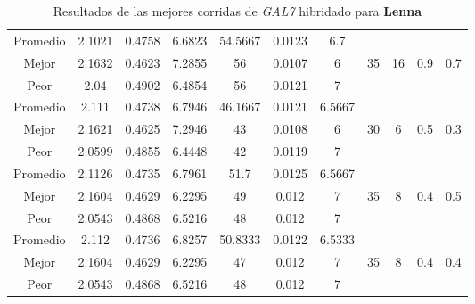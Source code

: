 \begin{table}[h!]
\begin{center}
\begin{tabular}{|c|c|c|c|c|c|c|c|c|c|c|}
        \hline
        \hline
            Promedio  & 2.1021 & 0.4758 & 6.6823 & 54.5667 & 0.0123 & 6.7 &  &  &  & \\
            \cline{1-7}
            Mejor & 2.1632 & 0.4623  & 7.2855 & 56 & 0.0107 & 6 & 35 & 16 & 0.9 & 0.7\\
            \cline{1-7}
            Peor & 2.04 & 0.4902  & 6.4854 & 56 & 0.0121 & 7 &  &  &  & \\
        \hline
        \hline
            Promedio  & 2.111 & 0.4738 & 6.7946 & 46.1667 & 0.0121 & 6.5667 &  &  &  & \\
            \cline{1-7}
            Mejor & 2.1621 & 0.4625  & 7.2946 & 43 & 0.0108 & 6 & 30 & 6 & 0.5 & 0.3\\
            \cline{1-7}
            Peor & 2.0599 & 0.4855  & 6.4448 & 42 & 0.0119 & 7 &  &  &  & \\
        \hline
        \hline
            Promedio  & 2.1126 & 0.4735 & 6.7961 & 51.7 & 0.0125 & 6.5667 &  &  &  & \\
            \cline{1-7}
            Mejor & 2.1604 & 0.4629  & 6.2295 & 49 & 0.012 & 7 & 35 & 8 & 0.4 & 0.5\\
            \cline{1-7}
            Peor & 2.0543 & 0.4868  & 6.5216 & 48 & 0.012 & 7 &  &  &  & \\
        \hline
        \hline
            Promedio  & 2.112 & 0.4736 & 6.8257 & 50.8333 & 0.0122 & 6.5333 &  &  &  & \\
            \cline{1-7}
            Mejor & 2.1604 & 0.4629  & 6.2295 & 47 & 0.012 & 7 & 35 & 8 & 0.4 & 0.4\\
            \cline{1-7}
            Peor & 2.0543 & 0.4868  & 6.5216 & 48 & 0.012 & 7 &  &  &  & \\
        \hline
        \end{tabular}
        \caption{Resultados de las mejores corridas de \emph{GAL7} hibridado para {\bf Lenna}}
        \label{tb:tableGAL7}
    \end{center}
\end{table}
